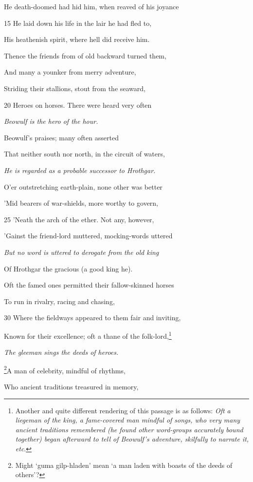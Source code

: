 He death-doomed had hid him, when reaved of his joyance

15
He laid down his life in the lair he had fled to,

His heathenish spirit, where hell did receive him.

Thence the friends from of old backward turned them,

And many a younker from merry adventure,

Striding their stallions, stout from the seaward,

20
Heroes on horses. There were heard very often

\emph{Beowulf is the hero
of the hour.}

Beowulf’s praises; many often asserted

That neither south nor north, in the circuit of waters,

\emph{He is regarded as a
probable successor
to Hrothgar.}

O’er outstretching earth-plain, none other was better

’Mid bearers of war-shields, more worthy to govern,

25
’Neath the arch of the ether. Not any, however,

’Gainst the friend-lord muttered, mocking-words uttered

\emph{But no word is
uttered to derogate
from the old king}

Of Hrothgar the gracious (a good king he).

Oft the famed ones permitted their fallow-skinned horses

To run in rivalry, racing and chasing,

30
Where the fieldways appeared to them fair and inviting,

Known for their excellence; oft a thane of the folk-lord,\footnote{Another and quite different rendering of this passage is as follows: \emph{Oft
a liegeman of the king, a fame-covered man mindful of songs, who very many
ancient traditions remembered (he found other word-groups accurately bound
together) began afterward to tell of Beowulf’s adventure, skilfully to narrate
it, etc}.}

\emph{The gleeman sings
the deeds of heroes.}

\footnote{Might ‘guma gilp-hladen’ mean ‘a man laden with boasts of the deeds
of others’?}A man of celebrity, mindful of rhythms,

Who ancient traditions treasured in memory,

